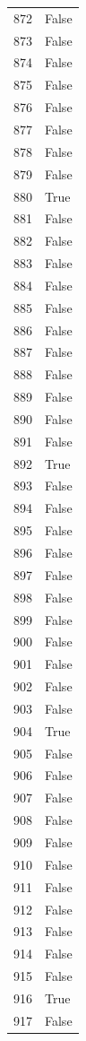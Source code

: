 \documentclass[
  letterpaper,
  DIV=11,
  numbers=noendperiod]{scrreprt}
\begin{document}
\begin{tabular}{ll}
872  &  False \\
873  &  False \\
874  &  False \\
875  &  False \\
876  &  False \\
877  &  False \\
878  &  False \\
879  &  False \\
880  &   True \\
881  &  False \\
882  &  False \\
883  &  False \\
884  &  False \\
885  &  False \\
886  &  False \\
887  &  False \\
888  &  False \\
889  &  False \\
890  &  False \\
891  &  False \\
892  &   True \\
893  &  False \\
894  &  False \\
895  &  False \\
896  &  False \\
897  &  False \\
898  &  False \\
899  &  False \\
900  &  False \\
901  &  False \\
902  &  False \\
903  &  False \\
904  &   True \\
905  &  False \\
906  &  False \\
907  &  False \\
908  &  False \\
909  &  False \\
910  &  False \\
911  &  False \\
912  &  False \\
913  &  False \\
914  &  False \\
915  &  False \\
916  &   True \\
917  &  False \\

\end{tabular}
\end{document}
